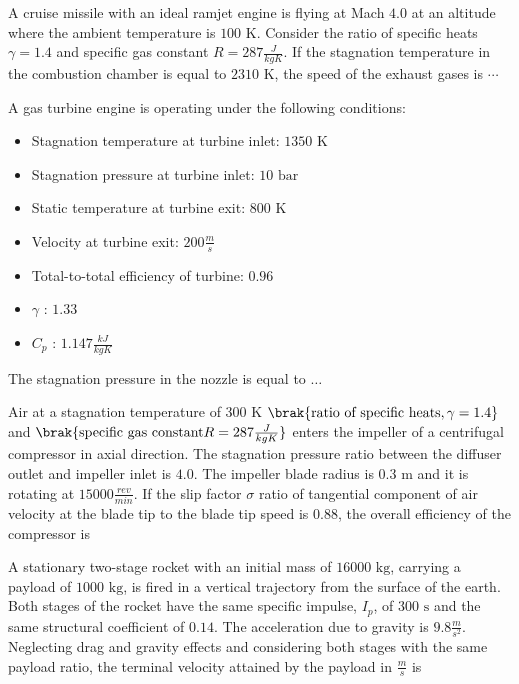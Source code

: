     \item A cruise missile with an ideal ramjet engine is flying at Mach $4.0$ at an altitude where the ambient temperature is $100 \text{ K}$. Consider the ratio of specific heats $\gamma = 1.4$ and specific gas constant $R = 287 \frac{J}{kg K}$. If the stagnation temperature in the combustion chamber is equal to $2310 \text{ K}$, the speed of the exhaust gases  is $\cdots$

    \item A gas turbine engine is operating under the following conditions:
    \begin{itemize}
        \item Stagnation temperature at turbine inlet: $1350 \text{ K}$
        \item Stagnation pressure at turbine inlet: $10 \text{ bar}$
        \item Static temperature at turbine exit: $800 \text{ K}$
        \item Velocity at turbine exit: $200  \frac{m}{s}$
        \item Total-to-total efficiency of turbine: $0.96$
        \item $\gamma$ : $1.33$
        \item $C_p$ : $1.147 \frac{ kJ}{kg K}$
    \end{itemize}
    
    The stagnation pressure  in the nozzle  is equal to $\dots$

    \item Air at a stagnation temperature of $300 \text{ K}$ $\brak{\text{ratio of specific heats}, \gamma = 1.4 }$and $\brak{\text{specific gas constant} R = 287 \frac {J}{kg K}}$ enters the impeller of a centrifugal compressor in axial direction. The stagnation pressure ratio between the diffuser outlet and impeller inlet is $4.0$. The impeller blade radius is $0.3 \text{ m}$ and it is rotating at $15000 \frac{ rev}{min}$. If the slip factor $\sigma$ ratio of tangential component of air velocity   at the blade tip to the blade tip speed is $0.88$, the overall efficiency  of the compressor  is

    \item A stationary two-stage rocket with an initial mass of $16000 \text{ kg}$, carrying a payload of $1000 \text{ kg}$, is fired in a vertical trajectory from the surface of the earth. Both stages of the rocket have the same specific impulse, $I_p$, of $300 \text{ s}$ and the same structural coefficient of $0.14$. The acceleration due to gravity is $9.8\frac{ m}{s^2}$. Neglecting drag and gravity effects and considering both stages with the same payload ratio, the terminal velocity attained by the payload in $\frac{m}{s}$ is

